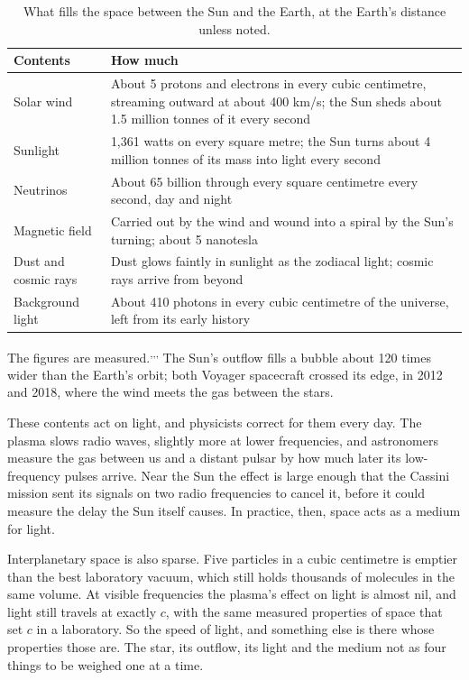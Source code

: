 \documentclass[11pt,a4paper]{article}
\begin{document}
\begin{table}[h]\centering\small
\caption{What fills the space between the Sun and the Earth, at the Earth's distance unless noted.}
\begin{tabularx}{\linewidth}{@{}l X@{}}\toprule
\textbf{Contents} & \textbf{How much}\\\midrule
Solar wind & About 5 protons and electrons in every cubic centimetre, streaming outward at about 400 km/s; the Sun sheds about 1.5 million tonnes of it every second\\
Sunlight & 1,361 watts on every square metre; the Sun turns about 4 million tonnes of its mass into light every second\\
Neutrinos & About 65 billion through every square centimetre every second, day and night\\
Magnetic field & Carried out by the wind and wound into a spiral by the Sun's turning; about 5 nanotesla\\
Dust and cosmic rays & Dust glows faintly in sunlight as the zodiacal light; cosmic rays arrive from beyond\\
Background light & About 410 photons in every cubic centimetre of the universe, left from its early history\\\bottomrule
\end{tabularx}\label{tab:full}\end{table}

The figures are measured.\textsuperscript{,}\textsuperscript{,}\textsuperscript{,} The Sun's outflow fills a bubble about 120 times wider than the Earth's orbit; both Voyager spacecraft crossed its edge, in 2012 and 2018, where the wind meets the gas between the stars.

These contents act on light, and physicists correct for them every day. The plasma slows radio waves, slightly more at lower frequencies, and astronomers measure the gas between us and a distant pulsar by how much later its low-frequency pulses arrive. Near the Sun the effect is large enough that the Cassini mission sent its signals on two radio frequencies to cancel it, before it could measure the delay the Sun itself causes. In practice, then, space acts as a medium for light.

Interplanetary space is also sparse. Five particles in a cubic centimetre is emptier than the best laboratory vacuum, which still holds thousands of molecules in the same volume. At visible frequencies the plasma's effect on light is almost nil, and light still travels at exactly $c$, with the same measured properties of space that set $c$ in a laboratory. So  the speed of light, and something else is there whose properties those are. The star, its outflow, its light and the medium  not as four things to be weighed one at a time.
\end{document}
